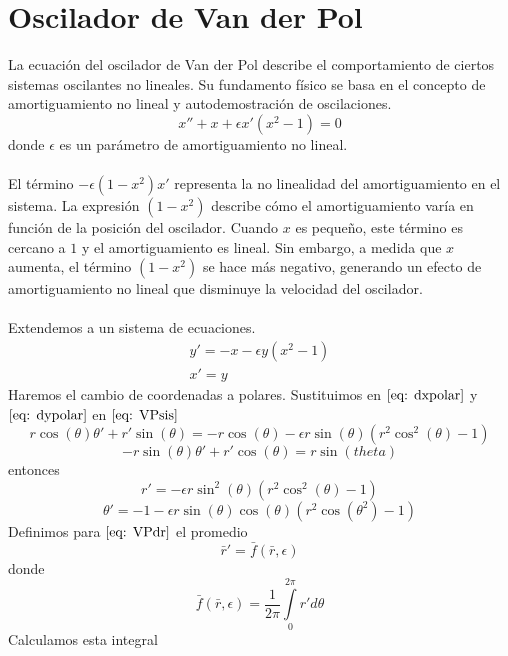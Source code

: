 \section{Oscilador de Van der Pol}
La ecuación del oscilador de Van der Pol describe el comportamiento de ciertos sistemas oscilantes no lineales.
Su fundamento físico se basa en el concepto de amortiguamiento no lineal y autodemostración de oscilaciones.
\begin{equation}\label{eq: VP}
	x''+x+\epsilon x'(x^2-1)=0
\end{equation}
donde $\epsilon$ es un parámetro de amortiguamiento no lineal.\\
\\El término $-\epsilon(1 - x^2)x'$ representa la no linealidad del amortiguamiento en el sistema. La expresión
$(1 - x^2)$ describe cómo el amortiguamiento varía en función de la posición del oscilador. Cuando $x$ es
pequeño, este término es cercano a $1$ y el amortiguamiento es lineal. Sin embargo, a medida que $x$
aumenta, el término $(1 - x^2)$ se hace más negativo, generando un efecto de amortiguamiento no lineal que
disminuye la velocidad del oscilador.\\
\\Extendemos a un sistema de ecuaciones.
\begin{equation}\label{eq: VPsis}
	\begin{matrix}
		y'=-x-\epsilon y(x^2-1) \\
		x'=y
	\end{matrix}
\end{equation}
Haremos el cambio de coordenadas a polares.
Sustituimos en $\eqref{eq: dxpolar}$ y $\eqref{eq: dypolar}$ en $\eqref{eq: VPsis}$
$$r\cos(\theta)\theta'+r'\sin(\theta)=-r\cos(\theta)-\epsilon r\sin(\theta)(r^2\cos^2(\theta)-1)$$
$$-r\sin(\theta)\theta'+r'\cos(\theta)=r\sin(theta)$$
entonces
\begin{equation}\label{eq: VPdr}
	r'=-\epsilon r\sin^2(\theta)(r^2\cos^2(\theta)-1)
\end{equation}
\begin{equation}\label{eq: VPdtheta}
	\theta'=-1-\epsilon r\sin(\theta)\cos(\theta)(r^2\cos(\theta^2)-1)
\end{equation}
Definimos para $\eqref{eq: VPdr}$ el promedio
\begin{equation}\label{eq: drbar}
	\bar{r}'=\bar{f}(\bar{r},\epsilon)
\end{equation}
donde
$$\bar{f}(\bar{r},\epsilon)=\frac{1}{2\pi}\int\limits_0^{2\pi}r'd\theta$$
Calculamos esta integral
